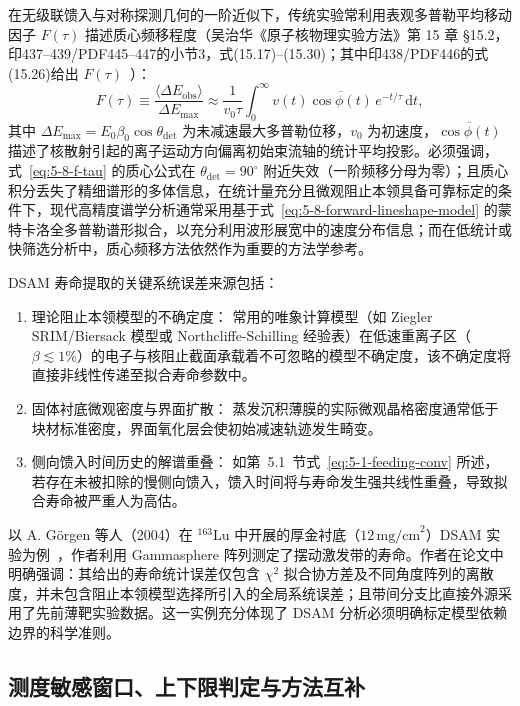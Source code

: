 在无级联馈入与对称探测几何的一阶近似下，传统实验常利用表观多普勒平均移动因子 $F(\tau)$ 描述质心频移程度（吴治华《原子核物理实验方法》第 15 章 §15.2，印437–439/PDF445–447的小节3，式(15.17)–(15.30)；其中印438/PDF446的式(15.26)给出 $F(\tau)$~\cite{book-wu-nuclear-experiment-methods}）：
\begin{equation}\label{eq:5-8-f-tau}
F(\tau) \equiv \frac{\langle \Delta E_{\mathrm{obs}} \rangle}{\Delta E_{\max}} \approx \frac{1}{v_0 \tau} \int_0^\infty v(t) \overline{\cos\phi(t)} \, e^{-t/\tau} \, \mathrm{d}t,
\end{equation}
其中 $\Delta E_{\max} = E_0 \beta_0 \cos\theta_{\mathrm{det}}$ 为未减速最大多普勒位移，$v_0$ 为初速度，$\overline{\cos\phi(t)}$ 描述了核散射引起的离子运动方向偏离初始束流轴的统计平均投影。必须强调，式~\eqref{eq:5-8-f-tau} 的质心公式在 $\theta_{\mathrm{det}} = 90^\circ$ 附近失效（一阶频移分母为零）；且质心积分丢失了精细谱形的多体信息，在统计量充分且微观阻止本领具备可靠标定的条件下，现代高精度谱学分析通常采用基于式~\eqref{eq:5-8-forward-lineshape-model} 的蒙特卡洛全多普勒谱形拟合，以充分利用波形展宽中的速度分布信息；而在低统计或快筛选分析中，质心频移方法依然作为重要的方法学参考。

DSAM 寿命提取的关键系统误差来源包括：
\begin{enumerate}
\item 理论阻止本领模型的不确定度：
常用的唯象计算模型（如 Ziegler SRIM/Biersack 模型或 Northcliffe-Schilling 经验表）在低速重离子区（$\beta \lesssim 1\%$）的电子与核阻止截面承载着不可忽略的模型不确定度，该不确定度将直接非线性传递至拟合寿命参数中。
\item 固体衬底微观密度与界面扩散：
蒸发沉积薄膜的实际微观晶格密度通常低于块材标准密度，界面氧化层会使初始减速轨迹发生畸变。
\item 侧向馈入时间历史的解谱重叠：
如第~5.1~节式~\eqref{eq:5-1-feeding-conv} 所述，若存在未被扣除的慢侧向馈入，馈入时间将与寿命发生强共线性重叠，导致拟合寿命被严重人为高估。
\end{enumerate}

以 A. Görgen 等人（2004）在 $^{163}\mathrm{Lu}$ 中开展的厚金衬底（$12\,\text{mg/cm}^2$）DSAM 实验为例~\cite{campaign-g07-gorgen-2004-163lu-quadrupole-moments}，作者利用 Gammasphere 阵列测定了摆动激发带的寿命。作者在论文中明确强调：其给出的寿命统计误差仅包含 $\chi^2$ 拟合协方差及不同角度阵列的离散度，并未包含阻止本领模型选择所引入的全局系统误差；且带间分支比直接外源采用了先前薄靶实验数据。这一实例充分体现了 DSAM 分析必须明确标定模型依赖边界的科学准则。

\subsection{测度敏感窗口、上下限判定与方法互补}\label{subsec:5-8-4}

